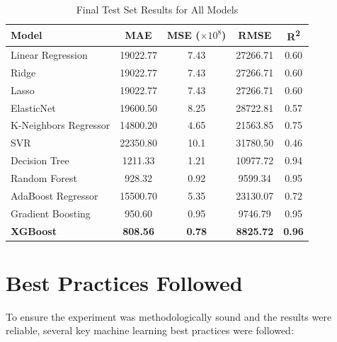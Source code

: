 \documentclass[12pt]{article}
\begin{document}
\begin{table}[H]
\centering
\caption{Final Test Set Results for All Models}
\label{tab:test_comparison}
\small
\begin{tabular}{@{}lcccc@{}}
\toprule
\textbf{Model} & \textbf{MAE} & \textbf{MSE} ($\times10^8$) & \textbf{RMSE} & \textbf{R\textsuperscript{2}} \\
\midrule
Linear Regression & 19022.77 & 7.43 & 27266.71 & 0.60 \\
Ridge & 19022.77 & 7.43 & 27266.71 & 0.60 \\
Lasso & 19022.77 & 7.43 & 27266.71 & 0.60 \\
ElasticNet & 19600.50 & 8.25 & 28722.81 & 0.57 \\
K-Neighbors Regressor & 14800.20 & 4.65 & 21563.85 & 0.75 \\
SVR & 22350.80 & 10.1 & 31780.50 & 0.46 \\
Decision Tree & 1211.33 & 1.21 & 10977.72 & 0.94 \\
Random Forest & 928.32 & 0.92 & 9599.34 & 0.95 \\
AdaBoost Regressor & 15500.70 & 5.35 & 23130.07 & 0.72 \\
Gradient Boosting & 950.60 & 0.95 & 9746.79 & 0.95 \\
\textbf{XGBoost} & \textbf{808.56} & \textbf{0.78} & \textbf{8825.72} & \textbf{0.96} \\
\bottomrule
\end{tabular}
\end{table}

\section{Best Practices Followed}
To ensure the experiment was methodologically sound and the results were reliable, several key machine learning best practices were followed:
\end{document}
